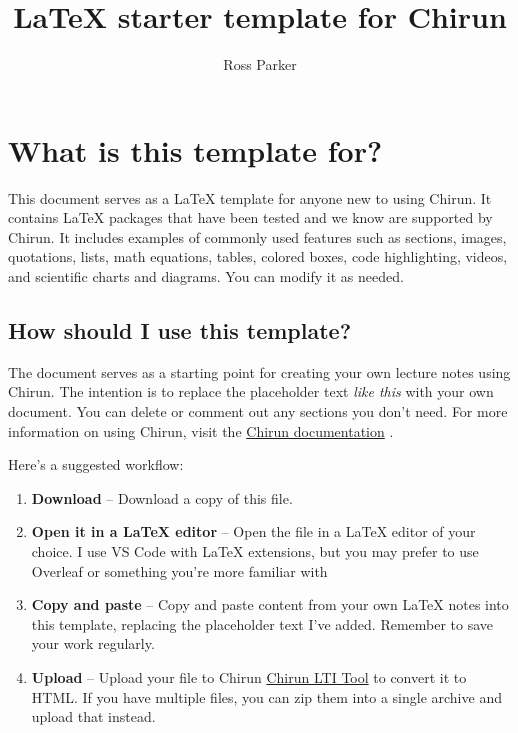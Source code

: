 \documentclass{article} %
\title{LaTeX starter template for Chirun} %
\author{Ross Parker}
\begin{document}
\maketitle

\section{What is this template for?} %
This document serves as a LaTeX template for anyone new to using Chirun. It contains LaTeX packages that have been tested and we know are supported by Chirun. It includes examples of commonly used features such as sections, images, quotations, lists, math equations, tables, colored boxes, code highlighting, videos, and scientific charts and diagrams. You can modify it as needed.

\subsection{How should I use this template?} %
The document serves as a starting point for creating your own lecture notes using Chirun. The intention is to replace the placeholder text \textit{like this}  with your own document. You can delete or comment out any sections you don't need. For more information on using Chirun, visit the \href{https://chirun.org.uk/docs/en/latest/}{Chirun documentation} \citep{chirunTutorial}.

Here's a suggested workflow:

\begin{enumerate}
    \item \textbf{Download} – Download a copy of this file.
    \item \textbf{Open it in a LaTeX editor} – Open the file in a LaTeX editor of your choice. I use VS Code with LaTeX extensions, but you may prefer to use Overleaf or something you're more familiar with
    \item \textbf{Copy and paste} – Copy and paste content from your own LaTeX notes into this template, replacing the placeholder text I've added. Remember to save your work regularly.
    \item \textbf{Upload} – Upload your file to Chirun \href{https://lti.chirun.org.uk/}{Chirun LTI Tool} to convert it to HTML. If you have multiple files, you can zip them into a single archive and upload that instead.
\end{enumerate}
\end{document}
